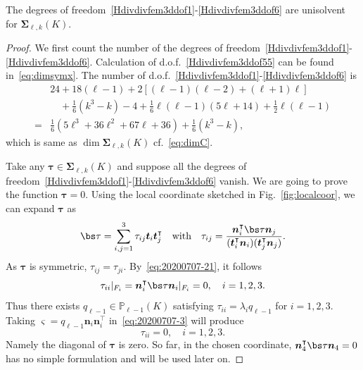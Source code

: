 \begin{theorem}\label{lem:unisovlenHdivdivfem}
The degrees of freedom~\eqref{Hdivdivfem3ddof1}-\eqref{Hdivdivfem3ddof6} are unisolvent for $\boldsymbol \Sigma_{\ell,k}(K)$.
\end{theorem}
\begin{proof}
We first count the number of the degrees of freedom~\eqref{Hdivdivfem3ddof1}-\eqref{Hdivdivfem3ddof6}. Calculation of d.o.f.~\eqref{Hdivdivfem3ddof55} can be found in~\eqref{eq:dimsymx}.
The number of d.o.f.~\eqref{Hdivdivfem3ddof1}-\eqref{Hdivdivfem3ddof6} is
\begin{align*}
&24+18(\ell-1)+2[(\ell-1)(\ell-2)+(\ell+1)\ell] \\
&\quad+\frac{1}{6}(k^3-k)-4+\frac{1}{6}\ell(\ell-1)(5\ell+14) +\frac{1}{2}\ell(\ell-1) \\
=&\frac{1}{6}(5\ell^3+36\ell^2+67\ell+36)+\frac{1}{6}(k^3-k),
\end{align*}
which is same as $\dim\boldsymbol \Sigma_{\ell,k}(K)$ cf.~\eqref{eq:dimC}. 



Take any $\boldsymbol \tau\in\boldsymbol \Sigma_{\ell,k}(K)$ and
suppose all the degrees of freedom~\eqref{Hdivdivfem3ddof1}-\eqref{Hdivdivfem3ddof6} vanish. We are going to prove the function $\boldsymbol \tau = 0$. 
Using the local coordinate sketched in Fig.~\ref{fig:localcoor}, we can expand $\boldsymbol \tau$ as
\[
\bs\tau=\sum_{i,j=1}^3\tau_{ij}\boldsymbol t_i\boldsymbol t_j^{\intercal} \quad\textrm{with}\quad \tau_{ij}=\frac{\boldsymbol n_i^{\intercal}\bs\tau\boldsymbol n_j}{(\boldsymbol t_i^{\intercal}\boldsymbol n_i)(\boldsymbol t_j^{\intercal}\boldsymbol n_j)}.
\]
As $\boldsymbol \tau$ is symmetric, $\tau_{ij} = \tau_{ji}$. 
By~\eqref{eq:20200707-21}, it follows
\[
\tau_{ii}|_{F_i}=\boldsymbol n_i^{\intercal}\bs\tau\boldsymbol n_i|_{F_i}=0, \quad i = 1,2,3.
\]
Thus there exists $q_{\ell-1}\in \mathbb P_{\ell-1}(K)$ satisfying $\tau_{ii}=\lambda_iq_{\ell-1}$ for $i=1,2,3$.
Taking $\boldsymbol \varsigma = q_{\ell-1}\boldsymbol n_i\boldsymbol n_i^{\intercal}$ in~\eqref{eq:20200707-3} will produce 
\begin{equation}\label{eq:diagonal}
\tau_{ii}=0, \quad i = 1,2,3.
\end{equation}
Namely the diagonal of $\boldsymbol \tau$ is zero.
So far, in the chosen coordinate, $\boldsymbol n_4^{\intercal}\bs\tau\boldsymbol n_4 = 0$ has no simple formulation and will be used later on.


\end{proof}

